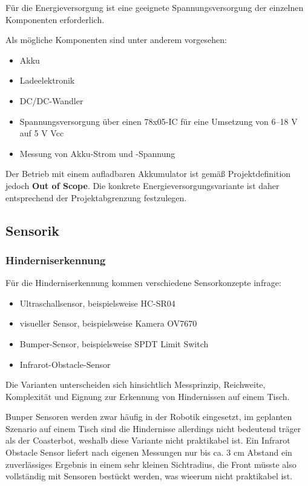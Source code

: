 \documentclass[
  a4paper,
  12pt,
  DIV=12,        %
  parskip=half,  %
  headings=small %
]{scrartcl}
\theoremstyle{definition}
\providecommand{\tightlist}{%
  \setlength{\itemsep}{0pt}\setlength{\parskip}{0pt}}
\theoremstyle{definition}
\begin{document}
Für die Energieversorgung ist eine geeignete Spannungsversorgung der
einzelnen Komponenten erforderlich.

Als mögliche Komponenten sind unter anderem vorgesehen:

\begin{itemize}
\tightlist
\item
  Akku
\item
  Ladeelektronik
\item
  DC/DC-Wandler
\item
  Spannungsversorgung über einen 78x05-IC für eine Umsetzung von 6--18 V
  auf 5 V Vcc
\item
  Messung von Akku-Strom und -Spannung
\end{itemize}

Der Betrieb mit einem aufladbaren Akkumulator ist gemäß
Projektdefinition jedoch \textbf{Out of Scope}. Die konkrete
Energieversorgungsvariante ist daher entsprechend der Projektabgrenzung
festzulegen.

\subsection{Sensorik}\label{sensorik}

\subsubsection{Hinderniserkennung}\label{hinderniserkennung}

Für die Hinderniserkennung kommen verschiedene Sensorkonzepte infrage:

\begin{itemize}
\tightlist
\item
  Ultraschallsensor, beispielsweise HC-SR04
\item
  visueller Sensor, beispielsweise Kamera OV7670
\item
  Bumper-Sensor, beispielsweise SPDT Limit Switch
\item
  Infrarot-Obstacle-Sensor
\end{itemize}

Die Varianten unterscheiden sich hinsichtlich Messprinzip, Reichweite,
Komplexität und Eignung zur Erkennung von Hindernissen auf einem Tisch.

Bunper Sensoren werden zwar häufig in der Robotik eingesetzt, im geplanten Szenario auf einem Tisch sind die Hindernisse allerdings nicht bedeutend träger als der Coasterbot, weshalb diese Variante nicht praktikabel ist. Ein Infrarot Obstacle Sensor liefert nach eigenen Messungen nur bis ca. 3 cm Abstand ein zuverlässiges Ergebnis in einem sehr kleinen Sichtradius, die Front müsste also vollständig mit Sensoren bestückt werden, was wieerum nicht praktikabel ist. 
\end{document}
